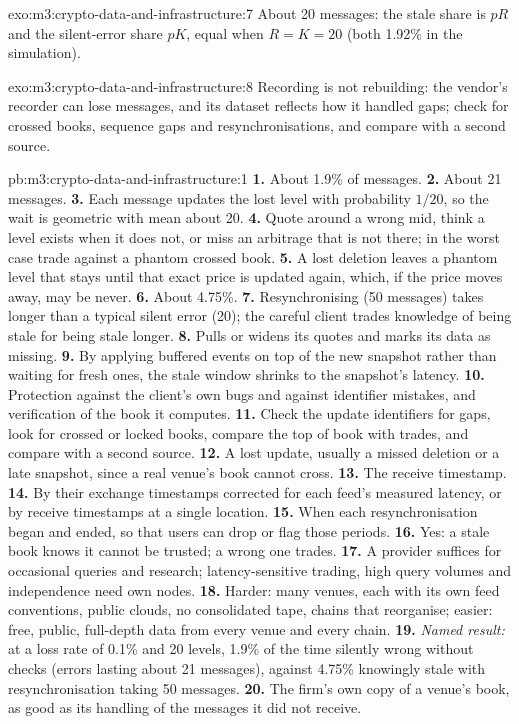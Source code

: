 \begin{solution}{exo:m3:crypto-data-and-infrastructure:7}
About 20 messages: the stale share is $pR$ and the silent-error share $pK$, equal when $R = K = 20$ (both 1.92\% in the simulation).
\end{solution}

\begin{solution}{exo:m3:crypto-data-and-infrastructure:8}
Recording is not rebuilding: the vendor's recorder can lose messages, and its dataset reflects how it handled gaps; check for crossed books, sequence
gaps and resynchronisations, and compare with a second source.
\end{solution}

\begin{solution}{pb:m3:crypto-data-and-infrastructure:1}
\textbf{1.} About 1.9\% of messages. \textbf{2.} About 21 messages. \textbf{3.} Each message updates the lost level with probability $1/20$, so the wait is
geometric with mean about 20. \textbf{4.} Quote around a wrong mid, think a level exists when it does not, or miss an arbitrage that is not there; in the
worst case trade against a phantom crossed book. \textbf{5.} A lost deletion leaves a phantom level that stays until that exact price is updated again,
which, if the price moves away, may be never. \textbf{6.} About 4.75\%. \textbf{7.} Resynchronising (50 messages) takes longer than a typical silent error
(20); the careful client trades knowledge of being stale for being stale longer. \textbf{8.} Pulls or widens its quotes and marks its data as missing.
\textbf{9.} By applying buffered events on top of the new snapshot rather than waiting for fresh ones, the stale window shrinks to the snapshot's latency.
\textbf{10.} Protection against the client's own bugs and against identifier mistakes, and verification of the book it computes. \textbf{11.} Check the update
identifiers for gaps, look for crossed or locked books, compare the top of book with trades, and compare with a second source. \textbf{12.} A lost update,
usually a missed deletion or a late snapshot, since a real venue's book cannot cross. \textbf{13.} The receive timestamp. \textbf{14.} By their exchange
timestamps corrected for each feed's measured latency, or by receive timestamps at a single location. \textbf{15.} When each resynchronisation began and ended,
so that users can drop or flag those periods. \textbf{16.} Yes: a stale book knows it cannot be trusted; a wrong one trades. \textbf{17.} A provider suffices
for occasional queries and research; latency-sensitive trading, high query volumes and independence need own nodes. \textbf{18.} Harder: many venues, each with
its own feed conventions, public clouds, no consolidated tape, chains that reorganise; easier: free, public, full-depth data from every venue and every chain.
\textbf{19.} \emph{Named result:} at a loss rate of 0.1\% and 20 levels, 1.9\% of the time silently wrong without checks (errors lasting about 21 messages),
against 4.75\% knowingly stale with resynchronisation taking 50 messages. \textbf{20.} The firm's own copy of a venue's book, as good as its handling of the
messages it did not receive.
\end{solution}

